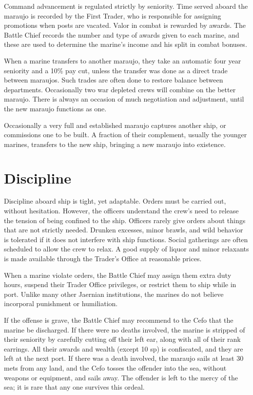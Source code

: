 Command advancement is regulated strictly by seniority. Time served aboard the maraujo is recorded by the First Trader, who is responsible for assigning promotions when posts are vacated.
Valor in combat is rewarded by awards. The Battle Chief records the number and type of awards given to each marine, and these are used to determine the marine’s income and his split in combat bonuses.

When a marine transfers to another maraujo, they take an automatic four year seniority and a 10\% pay cut, unless the transfer was done as a direct trade between maraujos. Such trades are often done to restore balance between departments. Occasionally two war depleted crews will combine on the better maraujo. There is always an occasion of much negotiation and adjustment, until the new maraujo functions as one.

Occasionally a very full and established maraujo captures another ship, or commissions one to be built. A fraction of their complement, usually the younger marines, transfers to the new ship, bringing a new maraujo into existence.

\section{Discipline}

Discipline aboard ship is tight, yet adaptable. Orders must be carried out, without hesitation. However, the officers understand the crew’s need to release the tension of being confined to the ship. Officers rarely give orders about things that are not strictly needed. Drunken excesses, minor brawls, and wild behavior is tolerated if it does not interfere with ship functions. Social gatherings are often scheduled to allow the crew to relax. A good supply of liquor and minor relaxants is made available through the Trader’s Office at reasonable prices.

When a marine violate orders, the Battle Chief may assign them extra duty hours, suspend their Trader Office privileges, or restrict them to ship while in port. Unlike many other Jaernian institutions, the marines do not believe incorporal punishment or humiliation.

If the offense is grave, the Battle Chief may recommend to the Cefo that the marine be discharged. If there were no deaths involved, the marine is stripped of their seniority by carefully cutting off their left ear, along with all of their rank earrings. All their awards and wealth (except 10 sp) is confiscated, and they are left at the next port. If there was a death involved, the maraujo sails at least 30 mets from any land, and the Cefo tosses the offender into the sea, without weapons or equipment, and sails away. The offender is left to the mercy of the sea; it is rare that any one survives this ordeal.

